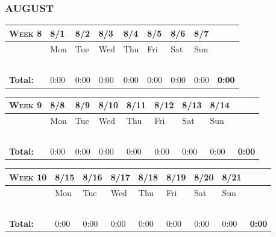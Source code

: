 \documentclass{article}
\begin{document}
\subsubsection*{AUGUST}

\begin{tabular}{ |m{1cm}||m{1cm}|m{1cm}|m{1cm}|m{1cm}|m{1cm}|m{1cm}|m{1cm}||m{1cm}|} 
\hline
\textsc{Week 8} & 8/1& 8/2 & 8/3 & 8/4 & 8/5 & 8/6 & 8/7 & \\ 
\hline
\rowcolor{lightgray} 
\cellcolor{white} & Mon & Tue & Wed & Thu & Fri & Sat & Sun & \cellcolor{white}\\ 
\hline
\hline
 & & & & & & & & \\ 
\hline
 & & & & & & & & \\ 
\hline
 & & & & & & & & \\ 
\hline
 & & & & & & & & \\ 
\hline
 & & & & & & & & \\ 
\hline
\textbf{Total:} & 0:00 & 0:00 & 0:00 & 0:00 & 0:00 & 0:00 & 0:00 & \textbf{0:00} \\
\hline
\end{tabular}

\vspace{0.2in}

\begin{tabular}{ |m{1cm}||m{1cm}|m{1cm}|m{1cm}|m{1cm}|m{1cm}|m{1cm}|m{1cm}||m{1cm}|} 
\hline
\textsc{Week 9} & 8/8& 8/9 & 8/10 & 8/11 & 8/12 & 8/13 & 8/14 & \\ 
\hline
\rowcolor{lightgray} 
\cellcolor{white} & Mon & Tue & Wed & Thu & Fri & Sat & Sun & \cellcolor{white}\\ 
\hline
\hline
 & & & & & & & & \\ 
\hline
 & & & & & & & & \\ 
\hline
 & & & & & & & & \\ 
\hline
 & & & & & & & & \\ 
\hline
 & & & & & & & & \\ 
\hline
\textbf{Total:} & 0:00 & 0:00 & 0:00 & 0:00 & 0:00 & 0:00 & 0:00 & \textbf{0:00} \\
\hline
\end{tabular}

\vspace{0.2in}

\begin{tabular}{ |m{1cm}||m{1cm}|m{1cm}|m{1cm}|m{1cm}|m{1cm}|m{1cm}|m{1cm}||m{1cm}|} 
\hline
\textsc{Week 10} & 8/15 & 8/16 & 8/17 & 8/18 & 8/19 & 8/20 & 8/21 & \\ 
\hline
\rowcolor{lightgray} 
\cellcolor{white} & Mon & Tue & Wed & Thu & Fri & Sat & Sun & \cellcolor{white}\\ 
\hline
\hline
 & & & & & & & & \\ 
\hline
 & & & & & & & & \\ 
\hline
 & & & & & & & & \\ 
\hline
 & & & & & & & & \\ 
\hline
 & & & & & & & & \\ 
\hline
\textbf{Total:} & 0:00 & 0:00 & 0:00 & 0:00 & 0:00 & 0:00 & 0:00 & \textbf{0:00} \\
\hline
\end{tabular}
\end{document}
